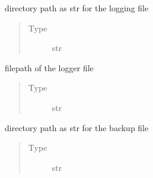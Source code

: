 \documentclass[letterpaper,10pt,english]{sphinxmanual}
\begin{document}
\begin{fulllineitems}
\begin{fulllineitems}
\begin{quote}
\begin{description}
\end{description}\end{quote}

\end{fulllineitems}


\begin{fulllineitems}
\label{\detokenize{chatwolf:chatwolf.game.Game.log_dir}}
directory path as str for the logging file
\begin{quote}\begin{description}
\item[{Type}] \leavevmode
str

\end{description}\end{quote}

\end{fulllineitems}


\begin{fulllineitems}
\label{\detokenize{chatwolf:chatwolf.game.Game.logfilename}}
filepath of the logger file
\begin{quote}\begin{description}
\item[{Type}] \leavevmode
str

\end{description}\end{quote}

\end{fulllineitems}


\begin{fulllineitems}
\label{\detokenize{chatwolf:chatwolf.game.Game.bkp_dir}}
directory path as str for the backup file
\begin{quote}\begin{description}
\item[{Type}] \leavevmode
str

\end{description}\end{quote}


\end{fulllineitems}
\end{fulllineitems}
\end{document}
